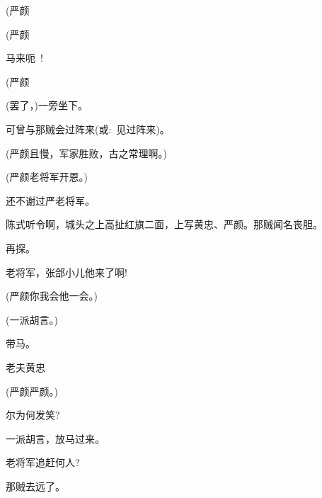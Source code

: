 {(严颜\hspace{30pt}


(严颜\hspace{30pt}


马来{\footnotesize 呃}~!

(严颜\hspace{30pt}

\vspace{5pt}

(罢了，)一旁坐下。

可曾与那贼会过阵来({\akai 或}:~见过阵来)。

(严颜\hspace{30pt}且慢，军家胜败，古之常理啊。)

(严颜\hspace{30pt}老将军开恩。)

还不谢过严老将军。

陈式听令啊，城头之上高扯红旗二面，上写黄忠、严颜。那贼闻名丧胆。

再探。

老将军，张郃小儿他来了啊!

(严颜\hspace{30pt}你我会他一会。)

(一派胡言。)

带马。

\vspace{5pt}

老夫黄忠

(严颜\hspace{30pt}严颜。)

尔为何发笑?

一派胡言，放马过来。

\vspace{5pt}

老将军追赶何人?

那贼去远了。

}
